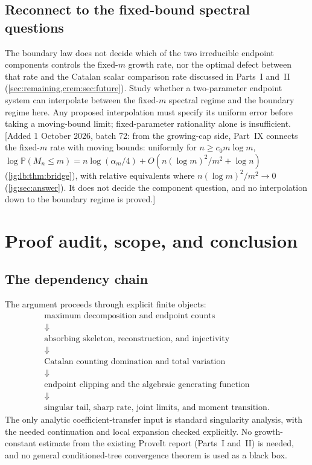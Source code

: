 \documentclass[11pt,a4paper]{article}
\theoremstyle{definition}\newaliascnt{definition}{theorem}
\theoremstyle{remark}\newaliascnt{remark}{theorem}
\newcommand{\ljP}{\mathbb P}
\begin{document}
\subsection{Reconnect to the fixed-bound spectral questions}
\label{lj:sec:q-reconnect}
The boundary law does not decide which of the two irreducible endpoint
components controls the fixed-$m$ growth rate, nor the optimal defect
between that rate and the Catalan scalar comparison rate discussed in
Parts~I and~II (\cref{sec:remaining,crem:sec:future}). Study whether a two-parameter endpoint system can interpolate
between the fixed-$m$ spectral regime and the boundary regime here.
Any proposed interpolation must specify its uniform error before taking
a moving-bound limit; fixed-parameter rationality alone is insufficient.
[Added 1 October 2026, batch 72: from the growing-cap side, Part~IX connects
the fixed-$m$ rate with moving bounds: uniformly for $n\ge c_0m\log m$,
$\log\ljP(M_n\le m)=n\log(\alpha_m/4)+O(n(\log m)^2/m^2+\log n)$
(\cref{jg:lb:thm:bridge}), with relative equivalents where
$n(\log m)^2/m^2\to0$ (\cref{jg:sec:answer}). It does not decide the
component question, and no interpolation down to the boundary regime is
proved.]

\section{Proof audit, scope, and conclusion}
\label{lj:sec:audit}

\subsection{The dependency chain}
The argument proceeds through explicit finite objects:
\[
\begin{gathered}
 \text{maximum decomposition and endpoint counts}\\
 \Downarrow\\
 \text{absorbing skeleton, reconstruction, and injectivity}\\
 \Downarrow\\
 \text{Catalan counting domination and total variation}\\
 \Downarrow\\
 \text{endpoint clipping and the algebraic generating function}\\
 \Downarrow\\
 \text{singular tail, sharp rate, joint limits, and moment transition}.
\end{gathered}
\]
The only analytic coefficient-transfer input is standard singularity
analysis, with the needed continuation and local expansion checked
explicitly. No growth-constant estimate from the existing ProveIt report
(Parts~I and~II) is needed, and no general conditioned-tree convergence theorem is used
as a black box.
\end{document}
